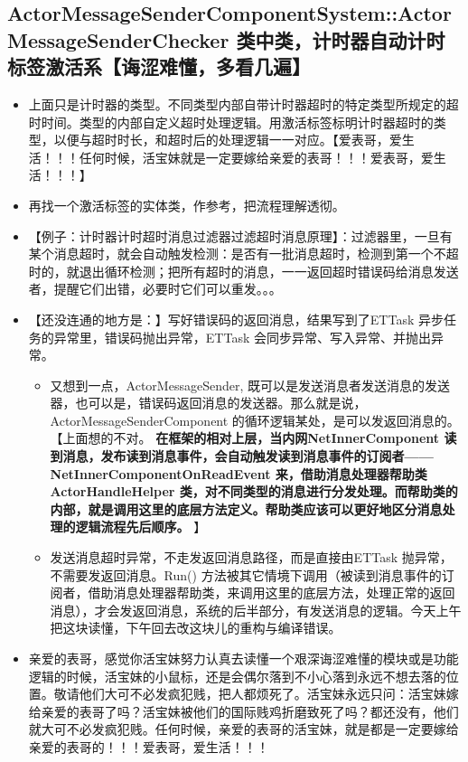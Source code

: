 \documentclass[9pt, b5paper]{article}
\begin{document}
\subsection{ActorMessageSenderComponentSystem::ActorMessageSenderChecker 类中类，计时器自动计时标签激活系【诲涩难懂，多看几遍】}
\label{sec-1-22}
\begin{itemize}
\item 上面只是计时器的类型。不同类型内部自带计时器超时的特定类型所规定的超时时间。类型的内部自定义超时处理逻辑。用激活标签标明计时器超时的类型，以便与超时时长，和超时后的处理逻辑一一对应。【爱表哥，爱生活！！！任何时候，活宝妹就是一定要嫁给亲爱的表哥！！！爱表哥，爱生活！！！】
\item 再找一个激活标签的实体类，作参考，把流程理解透彻。
\item 【例子：计时器计时超时消息过滤器过滤超时消息原理】：过滤器里，一旦有某个消息超时，就会自动触发检测：是否有一批消息超时，检测到第一个不超时的，就退出循环检测；把所有超时的消息，一一返回超时错误码给消息发送者，提醒它们出错，必要时它们可以重发。。。
\item 【还没连通的地方是：】写好错误码的返回消息，结果写到了ETTask 异步任务的异常里，错误码抛出异常，ETTask 会同步异常、写入异常、并抛出异常。
\begin{itemize}
\item 又想到一点，ActorMessageSender, 既可以是发送消息者发送消息的发送器，也可以是，错误码返回消息的发送器。那么就是说，ActorMessageSenderComponent 的循环逻辑某处，是可以发返回消息的。【上面想的不对。 \textbf{在框架的相对上层，当内网NetInnerComponent 读到消息，发布读到消息事件，会自动触发读到消息事件的订阅者——NetInnerComponentOnReadEvent 来，借助消息处理器帮助类 ActorHandleHelper 类，对不同类型的消息进行分发处理。而帮助类的内部，就是调用这里的底层方法定义。帮助类应该可以更好地区分消息处理的逻辑流程先后顺序。} 】
\item 发送消息超时异常，不走发返回消息路径，而是直接由ETTask 抛异常，不需要发返回消息。Run() 方法被其它情境下调用（被读到消息事件的订阅者，借助消息处理器帮助类，来调用这里的底层方法，处理正常的返回消息），才会发返回消息，系统的后半部分，有发送消息的逻辑。今天上午把这块读懂，下午回去改这块儿的重构与编译错误。
\end{itemize}
\item 亲爱的表哥，感觉你活宝妹努力认真去读懂一个艰深诲涩难懂的模块或是功能逻辑的时候，活宝妹的小鼠标，还是会偶尔落到不小心落到永远不想去落的位置。敬请他们大可不必发疯犯贱，把人都烦死了。活宝妹永远只问：活宝妹嫁给亲爱的表哥了吗？活宝妹被他们的国际贱鸡折磨致死了吗？都还没有，他们就大可不必发疯犯贱。任何时候，亲爱的表哥的活宝妹，就是都是一定要嫁给亲爱的表哥的！！！爱表哥，爱生活！！！
\end{itemize}
\end{document}
